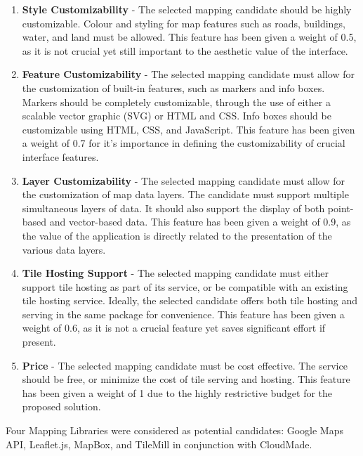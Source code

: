\documentclass{report}
\begin{document}
\begin{enumerate}

\item \textbf{Style Customizability} - The selected mapping candidate should be highly customizable. Colour and styling for map features such as roads, buildings, water, and land must be allowed. This feature has been given a weight of 0.5, as it is not crucial yet still important to the aesthetic value of the interface.

\item \textbf{Feature Customizability} - The selected mapping candidate must allow for the customization of built-in features, such as markers and info boxes. Markers should be completely customizable, through the use of either a scalable vector graphic (SVG) or HTML and CSS. Info boxes should be customizable using HTML, CSS, and JavaScript. This feature has been given a weight of 0.7 for it's importance in defining the customizability of crucial interface features.

\item \textbf{Layer Customizability} - The selected mapping candidate must allow for the customization of map data layers. The candidate must support multiple simultaneous layers of data. It should also support the display of both point-based and vector-based data. This feature has been given a weight of 0.9, as the value of the application is directly related to the presentation of the various data layers.

\item \textbf{Tile Hosting Support} - The selected mapping candidate must either support tile hosting as part of its service, or be compatible with an existing tile hosting service. Ideally, the selected candidate offers both tile hosting and serving in the same package for convenience. This feature has been given a weight of 0.6, as it is not a crucial feature yet saves significant effort if present.

\item \textbf{Price} - The selected mapping candidate must be cost effective. The service should be free, or minimize the cost of tile serving and hosting. This feature has been given a weight of 1 due to the highly restrictive budget for the proposed solution.

\end{enumerate}

Four Mapping Libraries were considered as potential candidates: Google Maps API, Leaflet.js, MapBox, and TileMill in conjunction with CloudMade.
\end{document}
